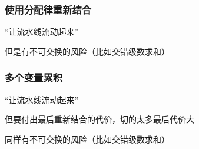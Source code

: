 \documentclass[12pt,AutoFakeBold,aspectratio=43,mathserif]{beamer}
\begin{document}
{\begin{frame}
    \end{frame}

    \begin{frame}
        \frametitle{使用分配律重新结合}
    
        “让流水线流动起来”
        
        但是有不可交换的风险（比如交错级数求和）
        \begin{figure}
        \end{figure}

    \end{frame}

    \begin{frame}
        \frametitle{多个变量累积}
    
        “让流水线流动起来”
        
        但要付出最后重新结合的代价，切的太多最后代价大

        同样有不可交换的风险（比如交错级数求和）
        \begin{figure}
        \end{figure}
        

\end{frame}}
\end{document}

